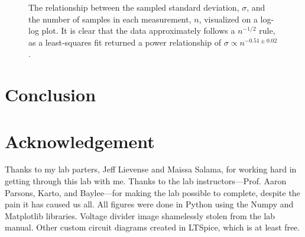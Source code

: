 \documentclass[12pt]{article}
\begin{document}
\begin{figure}[H]
\caption[SODUMB]{The relationship between the sampled standard deviation, $\sigma$, and the number of samples in each measurement, $n$, visualized on a log-log plot. It is clear that the data approximately follows a $n^{-1/2}$ rule, as a least-squares fit returned a power relationship of $\sigma \propto n^{-0.51\pm0.02}$.}
\label{fig:n_scaling2}
\end{figure}

\section*{Conclusion}



\section*{Acknowledgement}
Thanks to my lab parters, Jeff Lievense and Maissa Salama, for working hard in getting through this lab with me. Thanks to the lab instructors---Prof. Aaron Parsons, Karto, and Baylee---for making the lab possible to complete, despite the pain it has caused us all.
All figures were done in Python using the Numpy and Matplotlib libraries.
Voltage divider image shamelessly stolen from the lab manual.
Other custom circuit diagrams created in LTSpice, which is at least free.


\end{document}
